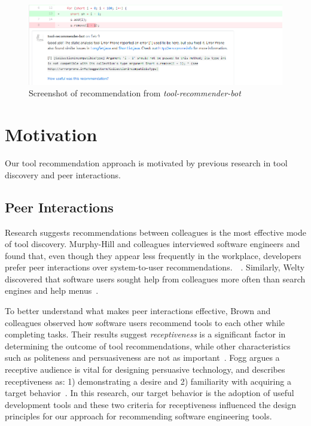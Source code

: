 \documentclass[sigconf,review,anonymous]{acmart}
\newcommand{\tool}{\textsl{tool-recommender-bot}}
\begin{document}
\begin{figure}
	\includegraphics[width=\textwidth]{images/screenshot.png}
	\caption{Screenshot of recommendation from \tool}	
	\label{fig:tool} 
\end{figure}

\section{Motivation}

Our tool recommendation approach is motivated by previous research in tool discovery and peer interactions.

\subsection{Peer Interactions}

Research suggests recommendations between colleagues is the most effective mode of tool discovery. Murphy-Hill and colleagues interviewed software engineers and found that, even though they appear less frequently in the workplace, developers prefer peer interactions over system-to-user recommendations.~\cite{MurphyHill2011PeerInteraction}~\cite{Murphy-Hill2015HowDoUsers}. Similarly, Welty discovered that software users sought help from colleagues more often than search engines and help menus~\cite{Welty2011Help}. 

To better understand what makes peer interactions effective, Brown and colleagues observed how software users recommend tools to each other while completing tasks. Their results suggest \emph{receptiveness} is a significant factor in determining the outcome of tool recommendations, while other characteristics such as politeness and persuasiveness are not as important~\cite{vlhcc17}. Fogg argues a receptive audience is vital for designing persuasive technology, and describes receptiveness as: 1) demonstrating a desire and 2) familiarity with acquiring a target behavior~\cite{FoggPersuasive}. In this research, our target behavior is the adoption of useful development tools and these two criteria for receptiveness influenced the design principles for our approach for recommending software engineering tools.
\end{document}
